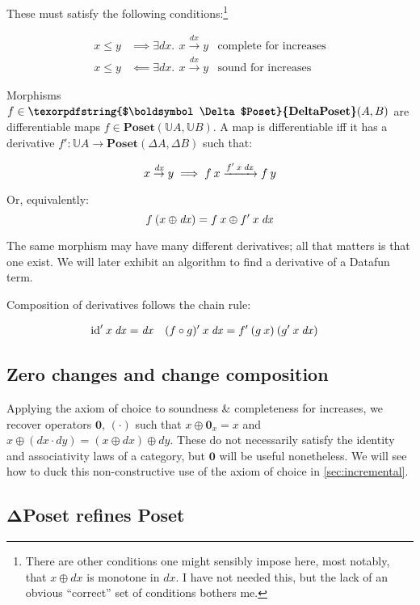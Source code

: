 \documentclass{rntz}\usepackage[a5]{rntzgeometry}\usepackage[fullwidth=130mm,width=330pt,]{narrow}
\newcommand\mathvar[1]{\ensuremath{#1}} %
\renewcommand\mathvar[1]{\ensuremath{\mathit{#1}}} %
\newcommand\cat\textbf
\newcommand\CP{\cat{\texorpdfstring{$\boldsymbol\Delta$Poset}{DeltaPoset}}}
\newcommand\Poset{\cat{Poset}}
\newcommand\D\Delta
\newcommand\zero{\ensuremath{\mathbold{0}}}
\newcommand\<{\mskip 4mu plus 4mu minus 1mu}
\newcommand\dx{\mathvar{dx}}
\newcommand\dy{\mathvar{dy}}
\newcommand\fname\text
\newcommand\id{\fname{id}}
\newcommand\valfn{\ensuremath{\mathbb{U}}}
\newcommand\vals{\valfn}
\newcommand\chgs[1]{\D{#1}}
\newcommand\deriv[1]{\ensuremath{#1'}}
\newcommand\upd{\mathbin{\oplus}}
\newcommand\quantifierspace{~\,}
\newcommand\ex[1]{\exists #1.\quantifierspace}
\newcommand\validarrow\to
\newcommand\valid[1]{\mathrel{\overset{#1}{\validarrow}}}
\newcommand\longvalid[1]{\mathrel{\xrightarrow{#1}}}
\newcommand\vld[3]{{#2 \valid{#1} #3}}
\newcommand\longvld[3]{{#2 \longvalid{#1} #3}}
\begin{document}
\noindent
These must satisfy the following conditions:\footnote{There are other conditions
  one might sensibly impose here, most notably, that $x \upd \dx$ is monotone in
  $\dx$. I have not needed this, but the lack of an obvious ``correct'' set of
  conditions bothers me.}

\begin{align*}
  x \le y &\implies \ex{\dx} \vld{\dx} x y
  & \text{complete for increases}\\
  x \le y &\impliedby \ex{\dx} \vld{\dx} x y
  & \text{sound for increases}
\end{align*}

\noindent
Morphisms $f \in \CP(A,B)$ are differentiable maps $f \in \Poset(\vals A, \vals
B)$. A map is differentiable iff it has a derivative $\deriv f : \vals A \to
\Poset(\chgs A, \chgs B)$ such that:

\[ \vld{\dx} x y \implies \longvld{\deriv f\<x\<\dx}{f\<x}{f\<y}\]

\noindent Or, equivalently:
\[ f\<(x \upd \dx) = f\<x \upd \deriv f\<x\<\dx \]

\noindent
The same morphism may have many different derivatives; all that matters is that
one exist. We will later exhibit an algorithm to find a derivative of a Datafun
term.

Composition of derivatives follows the chain rule:

\begin{align*}
  \deriv\id \<x\<\dx &= \dx
  & \deriv{(f \circ g)} \<x\<\dx &= \deriv f \<(g\<x) \<(\deriv g\<x\<\dx)
\end{align*}


\subsection{Zero changes and change composition}

Applying the axiom of choice to soundness \& completeness for increases, we
recover operators $\zero$, $(\cdot)$ such that $x \upd \zero_x = x$ and $x \upd
(\dx \cdot \dy) = (x \upd \dx) \upd \dy$. These do not necessarily satisfy the
identity and associativity laws of a category, but $\zero$ will be useful
nonetheless. We will see how to duck this non-constructive use of the axiom of
choice in \cref{sec:incremental}.


\subsection{\CP{} refines \Poset{}}
\label{sec:refines}
\end{document}
